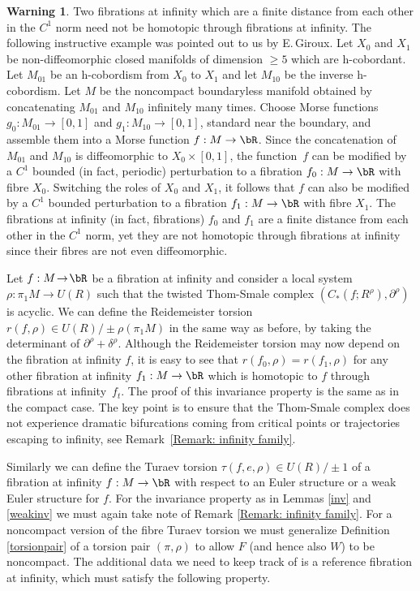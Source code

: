 \documentclass[JEP,XML,SOM,Unicode,NoFloatCountersInSection]{cedram}
\theoremstyle{plain}
\theoremstyle{definition}
\newtheorem{warning}[theorem]{Warning}
\begin{document}
\begin{warning}
Two fibrations at infinity which are a finite distance from each other in the $C^1$ norm need not be homotopic through fibrations at infinity. The following instructive example was pointed out to us by E.\,Giroux. Let $X_0$ and $X_1$ be non-diffeomorphic closed manifolds of dimension $\geq 5$ which are h-cobordant. Let $M_{01}$ be an h-cobordism from $X_0$ to $X_1$ and let $M_{10}$ be the inverse h-cobordism. Let $M$ be the noncompact boundaryless manifold obtained by concatenating $M_{01}$ and $M_{10}$ infinitely many times. Choose Morse functions $g_0:M_{01} \to [0,1]$ and $g_1:M_{10} \to [0,1]$, standard near the boundary, and assemble them into a Morse function $f:M \to \bR$. Since the concatenation of $M_{01}$ and $M_{10}$ is diffeomorphic to $X_0 \times [0,1]$, the function~$f$ can be modified by a $C^1$ bounded (in fact, periodic) perturbation to a fibration $f_0 : M \to \bR$ with fibre $X_0$. Switching the roles of $X_0$ and $X_1$, it follows that $f$ can also be modified by a $C^1$ bounded perturbation to a fibration $f_1: M \to \bR$ with fibre $X_1$. The fibrations at infinity (in fact, fibrations) $f_0$ and $f_1$ are a finite distance from each other in the $C^1$ norm, yet they are not homotopic through fibrations at infinity since their fibres are not even diffeomorphic.
\end{warning}

Let $f:M\!\to\!\bR$ be a fibration at infinity and consider a local system \hbox{$\rho: \pi_1 M\!\to\!U(R)$} such that the twisted Thom-Smale complex $(C_*(f; R^\rho), \partial^\rho)$ is acyclic. We can define the Reidemeister torsion $r(f,\rho) \in U(R) / \pm \rho(\pi_1M)$ in the same way as before, by taking the determinant of $\partial^\rho + \delta^\rho$. Although the Reidemeister torsion may now depend on the fibration at infinity $f$, it is easy to see that $r(f_0,\rho)=r(f_1,\rho)$ for any other fibration at infinity $f_1: M \to \bR$ which is homotopic to $f$ through fibrations at infinity~$f_t$. The proof of this invariance property is the same as in the compact case. The key point is to ensure that the Thom-Smale complex does not experience dramatic bifurcations coming from critical points or trajectories escaping to infinity, see Remark~\ref{Remark: infinity family}.

Similarly we can define the Turaev torsion $\tau(f,e,\rho) \in U(R) / \pm 1$ of a fibration at infinity $f:M \to \bR$ with respect to an Euler structure or a weak Euler structure for $f$. For the invariance property as in Lemmas \ref{inv} and \ref{weakinv} we must again take note of Remark \ref{Remark: infinity family}. For a noncompact version of the fibre Turaev torsion we must generalize Definition \ref{torsionpair} of a torsion pair $(\pi,\rho)$ to allow $F$ (and hence also $W$) to be noncompact. The additional data we need to keep track of is a reference fibration at infinity, which must satisfy the following property.
\end{document}
